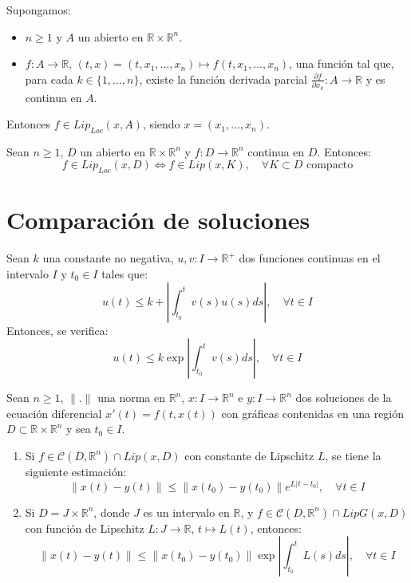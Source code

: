 \begin{proposition}
    Supongamos:
    \begin{itemize}
        \item $n \geq 1$ y $A$ un abierto en $\mathbb{R} \times \mathbb{R}^n$.
        \item $f: A \to \mathbb{R}$, $(t, x) = (t, x_1, \dots, x_n) \mapsto f(t, x_1, \dots, x_n)$, una función tal que, para cada $k \in \{1, \dots, n\}$, existe la función derivada parcial $\frac{\partial f}{\partial x_k}: A \to \mathbb{R}$ y es continua en $A$.
    \end{itemize}
    Entonces $f \in Lip_{Loc}(x, A)$, siendo $x = (x_1, \dots, x_n)$.
\end{proposition}

\begin{theorem}
    Sean $n \geq 1$, $D$ un abierto en $\mathbb{R} \times \mathbb{R}^n$ y $f: D \to \mathbb{R}^n$ continua en $D$.
    Entonces:
    $$f \in Lip_{Loc}(x, D) \Leftrightarrow f \in Lip(x, K), \quad \forall K \subset D \text{ compacto}$$
\end{theorem}

\section{Comparación de soluciones}
\begin{proposition}
    Sean $k$ una constante no negativa, $u, v: I \to \mathbb{R}^+$ dos funciones continuas en el intervalo $I$ y $t_0 \in I$ tales que:
    $$u(t) \leq k + \left| \int_{t_0}^t v(s)u(s)ds \right|, \quad \forall t \in I$$
    Entonces, se verifica:
    $$u(t) \leq k\exp\left| \int_{t_0}^t v(s)ds \right|, \quad \forall t \in I$$
\end{proposition}

\begin{theorem}
    Sean $n \geq 1$, $\|.\|$ una norma en $\mathbb{R}^n$, $x: I \to \mathbb{R}^n$ e $y: I \to \mathbb{R}^n$ dos soluciones de la ecuación diferencial $x'(t) = f(t, x(t))$ con gráficas contenidas en una región $D \subset \mathbb{R} \times \mathbb{R}^n$ y sea $t_0 \in I$.
    \begin{enumerate}
        \item Si $f \in \mathcal{C}(D, \mathbb{R}^n) \cap Lip(x, D)$ con constante de Lipschitz $L$, se tiene la siguiente estimación:
              $$\|x(t) - y(t)\| \leq \|x(t_0) - y(t_0)\| e^{L|t-t_0|}, \quad \forall t \in I$$
        \item Si $D = J \times \mathbb{R}^n$, donde $J$ es un intervalo en $\mathbb{R}$, y $f \in \mathcal{C}(D, \mathbb{R}^n) \cap LipG(x, D)$ con función de Lipschitz $L: J \to \mathbb{R}$, $t \mapsto L(t)$, entonces:
              $$\|x(t) - y(t)\| \leq \|x(t_0) - y(t_0)\| \exp\left| \int_{t_0}^t L(s)ds \right|, \quad \forall t \in I$$
    \end{enumerate}
\end{theorem}

